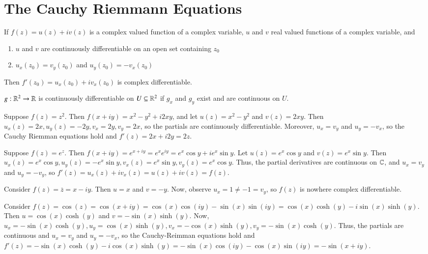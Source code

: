 \documentclass[12pt, a4paper, oneside, openright, titlepage]{book}
\begin{document}
\section{The Cauchy Riemmann Equations}

\begin{thm}
    If $f(z) = u(z) + iv(z)$ is a complex valued function of a complex variable, $u$ and $v$ real valued functions of a complex variable, and \begin{enumerate}
        \item $u$ and $v$ are continuously differentiable on an open set containing $z_0$
        \item $u_x(z_0) = v_y(z_0)$ and $u_y(z_0) = -v_x(z_0)$
    \end{enumerate}
    Then $f'(z_0) = u_x(z_0)+iv_x(z_0)$ is complex differentiable.
\end{thm}

\begin{defn}
    $g:\mathbb R^2\rightarrow \mathbb R$ is continuously differentiable on $U \subseteq \mathbb R^2$ if $g_x$ and $g_y$ exist and are continuous on $U$.
\end{defn}

\begin{eg}
    Suppose $f(z) = z^2$. Then $f(x+iy) = x^2-y^2 + i2xy$, and let $u(z) = x^2-y^2$ and $v(z) = 2xy$. Then $u_x(z) = 2x, u_y(z) = -2y, v_x = 2y, v_y = 2x$, so the partials are continuously differentiable. Moreover, $u_x = v_y$ and $u_y = -v_x$, so the Cauchy Riemman equations hold and $f'(z) = 2x+i2y = 2z$.
\end{eg}

\begin{eg}
    Suppose $f(z) = e^z$. Then $f(x+iy) = e^{x+iy} = e^xe^{iy} = e^x\cos y + ie^x\sin y$. Let $u(z) = e^x\cos y$ and $v(z) = e^x\sin y$. Then $u_x(z) = e^x\cos y, u_y(z) = -e^x\sin y, v_x(z) = e^x\sin y, v_y(z) = e^x\cos y$. Thus, the partial derivatives are continuous on $\mathbb C$, and $u_x = v_y$ and $u_y = -v_y$, so $f'(z) = u_x(z)+iv_x(z) = u(z)+iv(z) = f(z)$.
\end{eg}

\begin{eg}
    Consider $f(z) = \overline{z} = x-iy$. Then $u = x$ and $v = -y$. Now, observe $u_x = 1 \neq -1 = v_y$, so $f(z)$ is nowhere complex differentiable.
\end{eg}


\begin{eg}
    Consider $f(z) = \cos(z) = \cos(x+iy) = \cos(x)\cos(iy)-\sin(x)\sin(iy) = \cos(x)\cosh(y) - i\sin(x)\sinh(y)$. Then $u = \cos(x)\cosh(y)$ and $v = -\sin(x)\sinh(y)$. Now, $u_x = -\sin(x)\cosh(y), u_y = \cos(x)\sinh(y), v_x = -\cos(x)\sinh(y), v_y = -\sin(x)\cosh(y)$. Thus, the partials are continuous and $u_x = v_y$ and $u_y = -v_x$, so the Cauchy-Reimman equations hold and $f'(z) = -\sin(x)\cosh(y)-i\cos(x)\sinh(y) = -\sin(x)\cos(iy)-\cos(x)\sin(iy) = -\sin(x+iy)$.
\end{eg}
\end{document}
